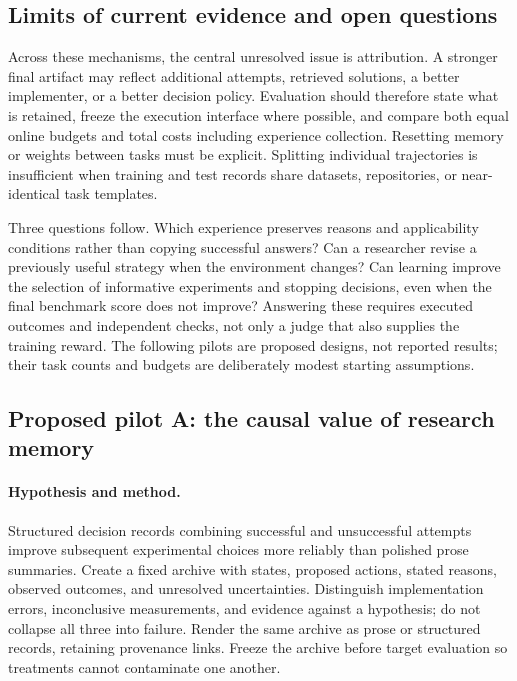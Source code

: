 \subsection{Limits of current evidence and open questions}

Across these mechanisms, the central unresolved issue is attribution. A stronger final artifact may reflect additional attempts, retrieved solutions, a better implementer, or a better decision policy. Evaluation should therefore state what is retained, freeze the execution interface where possible, and compare both equal online budgets and total costs including experience collection. Resetting memory or weights between tasks must be explicit. Splitting individual trajectories is insufficient when training and test records share datasets, repositories, or near-identical task templates.

Three questions follow. Which experience preserves reasons and applicability conditions rather than copying successful answers? Can a researcher revise a previously useful strategy when the environment changes? Can learning improve the selection of informative experiments and stopping decisions, even when the final benchmark score does not improve? Answering these requires executed outcomes and independent checks, not only a judge that also supplies the training reward. The following pilots are proposed designs, not reported results; their task counts and budgets are deliberately modest starting assumptions.

\subsection{Proposed pilot A: the causal value of research memory}

\paragraph{Hypothesis and method.}
Structured decision records combining successful and unsuccessful attempts improve subsequent experimental choices more reliably than polished prose summaries. Create a fixed archive with states, proposed actions, stated reasons, observed outcomes, and unresolved uncertainties. Distinguish implementation errors, inconclusive measurements, and evidence against a hypothesis; do not collapse all three into failure. Render the same archive as prose or structured records, retaining provenance links. Freeze the archive before target evaluation so treatments cannot contaminate one another.

